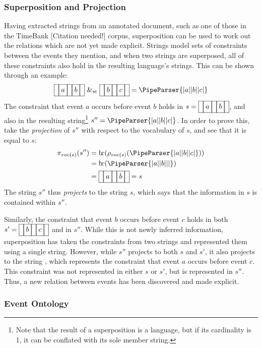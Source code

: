 \documentclass[a4paper,12pt,leqno]{article}
\newcommand{\bc}{{\rm b\!c}}
\newcommand{\vph}[1]{\vphantom{#1}}
\newcommand{\ebox}[1]{\fbox{$\vph{'(),}#1$}}
\newcommand{\nbBefore}[2]{\ebox{#1}\ebox{}\ebox{#2}}
\newcommand{\Before}[2]{\ebox{}\nbBefore{#1}{#2}\ebox{}}
\newcommand{\spvc}{~\&_{v\!c}~}
\newcommand{\EventString}[1]{
	\renewcommand*{\do}[1]{\ebox{##1}}%
	\PipeParser{#1}
}
\newcommand{\citeneeded}[1][]{{\color{red}[Citation needed!#1]}}
\begin{document}
\subsubsection{Superposition and Projection}\label{ssub:superposition}
Having extracted strings from an annotated document, such as one of those in the TimeBank \citeneeded{} corpus, superposition can be used to work out the relations which are not yet made explicit. Strings model sets of constraints between the events they mention, and when two strings are superposed, all of these constraints also hold in the resulting language's strings. This can be shown through an example:
\begin{align}
\Before{a}{b} \spvc \Before{b}{c} = \EventString{{}|a|{}|b|{}|c|{}}
\end{align}
The constraint that event $a$ occurs before event $b$ holds in $s = \Before{a}{b}$, and also in the resulting string\footnote{Note that the result of a superposition is a language, but if its cardinality is 1, it can be conflated with its sole member string.} $s'' = \EventString{{}|a|{}|b|{}|c|{}}$. In order to prove this, take the \textit{projection} of $s''$ with respect to the vocabulary of $s$, and see that it is equal to $s$:
\begin{align}
\pi_{voc(s)}(s'') &= \bc(\rho_{voc(s)}(\EventString{{}|a|{}|b|{}|c|{}}))\\ \notag
				  &= \bc(\EventString{{}|a|{}|b|{}|{}|{}})\\ \notag
				  &= \Before{a}{b} = s
\end{align}
The string $s''$ thus \textit{projects} to the string $s$, which says that the information in $s$ is contained within $s''$.

Similarly, the constraint that event $b$ occurs before event $c$ holds in both $s' = \Before{b}{c}$ and in $s''$. While this is not newly inferred information, superposition has taken the constraints from two strings and represented them using a single string. However, while $s''$ projects to both $s$ and $s'$, it also projects to the string \Before{a}{c}, which represents the constraint that event $a$ occurs before event $c$. This constraint was not represented in either $s$ or $s'$, but is represented in $s''$. Thus, a new relation between events has been discovered and made explicit. 


\subsubsection{Event Ontology}\label{ssub:ontology}
\end{document}
